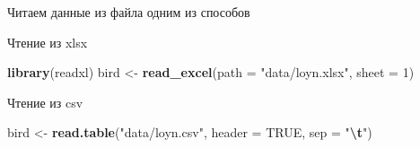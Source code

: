 \documentclass[
  ignorenonframetext,
  t,xcolor=table]{beamer}
\newenvironment{Shaded}{\begin{snugshade}}{\end{snugshade}}
\newcommand{\AttributeTok}[1]{\textcolor[rgb]{0.13,0.29,0.53}{#1}}
\newcommand{\ConstantTok}[1]{\textcolor[rgb]{0.56,0.35,0.01}{#1}}
\newcommand{\DecValTok}[1]{\textcolor[rgb]{0.00,0.00,0.81}{#1}}
\newcommand{\FunctionTok}[1]{\textcolor[rgb]{0.13,0.29,0.53}{\textbf{#1}}}
\newcommand{\NormalTok}[1]{#1}
\newcommand{\OtherTok}[1]{\textcolor[rgb]{0.56,0.35,0.01}{#1}}
\newcommand{\SpecialCharTok}[1]{\textcolor[rgb]{0.81,0.36,0.00}{\textbf{#1}}}
\newcommand{\StringTok}[1]{\textcolor[rgb]{0.31,0.60,0.02}{#1}}
\begin{document}
\begin{frame}[fragile]{Читаем данные из файла одним из способов}
\protect\hypertarget{ux447ux438ux442ux430ux435ux43c-ux434ux430ux43dux43dux44bux435-ux438ux437-ux444ux430ux439ux43bux430-ux43eux434ux43dux438ux43c-ux438ux437-ux441ux43fux43eux441ux43eux431ux43eux432}{}
\begin{block}{Чтение из xlsx}
\protect\hypertarget{ux447ux442ux435ux43dux438ux435-ux438ux437-xlsx}{}
\begin{Shaded}
\begin{Highlighting}[]
\FunctionTok{library}\NormalTok{(readxl)}
\NormalTok{bird }\OtherTok{\textless{}{-}} \FunctionTok{read\_excel}\NormalTok{(}\AttributeTok{path =} \StringTok{"data/loyn.xlsx"}\NormalTok{, }\AttributeTok{sheet =} \DecValTok{1}\NormalTok{)}
\end{Highlighting}
\end{Shaded}
\end{block}

\begin{block}{Чтение из csv}
\protect\hypertarget{ux447ux442ux435ux43dux438ux435-ux438ux437-csv}{}
\begin{Shaded}
\begin{Highlighting}[]
\NormalTok{bird }\OtherTok{\textless{}{-}} \FunctionTok{read.table}\NormalTok{(}\StringTok{"data/loyn.csv"}\NormalTok{, }\AttributeTok{header =} \ConstantTok{TRUE}\NormalTok{, }\AttributeTok{sep =} \StringTok{"}\SpecialCharTok{\textbackslash{}t}\StringTok{"}\NormalTok{)}
\end{Highlighting}
\end{Shaded}
\end{block}
\end{frame}
\end{document}
